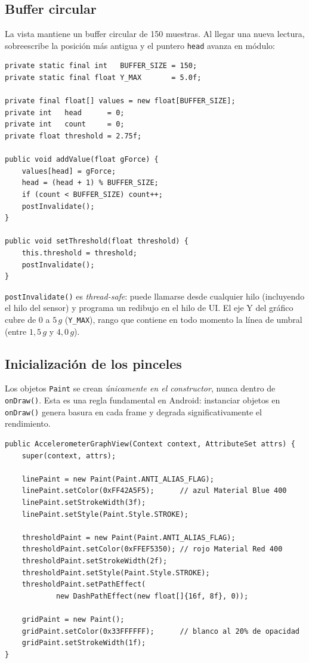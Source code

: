 \documentclass[12pt, a4paper]{article}
\begin{document}
\subsection{Buffer circular}

La vista mantiene un buffer circular de 150 muestras. Al llegar una nueva
lectura, sobreescribe la posici\'on m\'as antigua y el puntero \texttt{head}
avanza en m\'odulo:

\begin{lstlisting}[caption={Buffer circular y actualizaci\'on --- \texttt{AccelerometerGraphView.java}}]
private static final int   BUFFER_SIZE = 150;
private static final float Y_MAX       = 5.0f;

private final float[] values = new float[BUFFER_SIZE];
private int   head      = 0;
private int   count     = 0;
private float threshold = 2.75f;

public void addValue(float gForce) {
    values[head] = gForce;
    head = (head + 1) % BUFFER_SIZE;
    if (count < BUFFER_SIZE) count++;
    postInvalidate();
}

public void setThreshold(float threshold) {
    this.threshold = threshold;
    postInvalidate();
}
\end{lstlisting}

\texttt{postInvalidate()} es \emph{thread-safe}: puede llamarse desde cualquier
hilo (incluyendo el hilo del sensor) y programa un redibujo en el hilo de UI.
El eje Y del gr\'afico cubre de $0$ a $5\,g$ (\texttt{Y\_MAX}), rango que
contiene en todo momento la l\'inea de umbral (entre $1{,}5\,g$ y $4{,}0\,g$).

\subsection{Inicializaci\'on de los pinceles}

Los objetos \texttt{Paint} se crean \emph{\'unicamente en el constructor}, nunca
dentro de \texttt{onDraw()}. Esta es una regla fundamental en Android: instanciar
objetos en \texttt{onDraw()} genera basura en cada frame y degrada
significativamente el rendimiento.

\begin{lstlisting}[caption={Inicializaci\'on de \texttt{Paint} en el constructor --- \texttt{AccelerometerGraphView.java}}]
public AccelerometerGraphView(Context context, AttributeSet attrs) {
    super(context, attrs);

    linePaint = new Paint(Paint.ANTI_ALIAS_FLAG);
    linePaint.setColor(0xFF42A5F5);      // azul Material Blue 400
    linePaint.setStrokeWidth(3f);
    linePaint.setStyle(Paint.Style.STROKE);

    thresholdPaint = new Paint(Paint.ANTI_ALIAS_FLAG);
    thresholdPaint.setColor(0xFFEF5350); // rojo Material Red 400
    thresholdPaint.setStrokeWidth(2f);
    thresholdPaint.setStyle(Paint.Style.STROKE);
    thresholdPaint.setPathEffect(
            new DashPathEffect(new float[]{16f, 8f}, 0));

    gridPaint = new Paint();
    gridPaint.setColor(0x33FFFFFF);      // blanco al 20% de opacidad
    gridPaint.setStrokeWidth(1f);
}
\end{lstlisting}
\end{document}
